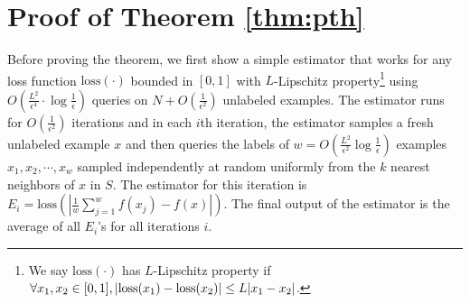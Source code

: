 \section{Proof of Theorem \ref{thm:pth}}
\label{sec:pthproof}
Before proving the theorem, we first show a simple estimator that works for any loss function $\mathrm{loss}(\cdot)$ bounded in $[0,1]$ with $L$-Lipschitz property\footnote{We say $\mathrm{loss}(\cdot)$ has $L$-Lipschitz property if $\forall x_1,x_2\in[0,1],|{\mathrm{loss}}(x_1)-{\mathrm{loss}}(x_2)|\leq L|x_1-x_2|$.} using $O(\frac{L^2}{\epsilon^4}\cdot\log\frac{1}{\epsilon})$ queries on $N+O(\frac{1}{\epsilon^2})$ unlabeled examples. The estimator runs for $O(\frac{1}{\epsilon^2})$ iterations and in each $i$th iteration, the estimator samples a fresh unlabeled example $x$ and then queries the labels of $w=O(\frac{L^2}{\epsilon^2}\log\frac{1}{\epsilon})$ examples $x_1,x_2,\cdots,x_w$ sampled independently at random uniformly from the $k$ nearest neighbors of $x$ in $S$. The estimator for this iteration is $E_i=\mathrm{loss}(|\frac{1}{w}\sum\limits_{j=1}^wf(x_j)-f(x)|)$. The final output of the estimator is the average of all $E_i$'s for all iterations $i$.

